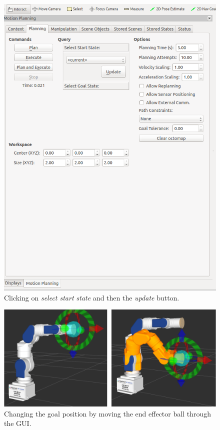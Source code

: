\begin{figure}
\includegraphics[scale=0.23]{images/motion_planning/gui_moving_procedure_4.png}
\centering
\caption{Clicking on \emph{select start state} and then the \emph{update} button.}
\label{fig:gui_procedure_2}
\end{figure}

\begin{figure}
\includegraphics[scale=0.23]{images/motion_planning/gui_end_effector.png}
\centering
\caption{Changing the goal position by moving the end effector ball through the GUI.}
\label{fig:gui_end_effector}
\end{figure}

